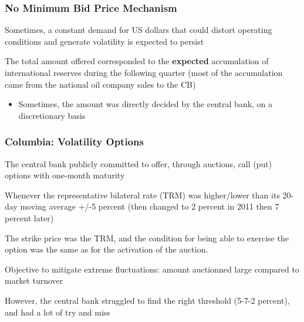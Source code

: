 \documentclass{beamer}
\newenvironment{largeitemize}{\itemize\addtolength{\itemsep}{10pt}}{\enditemize}
\begin{document}
\begin{frame}
  \frametitle{No Minimum Bid Price Mechanism}
  \begin{largeitemize}
  \item Sometimes, a constant demand for US dollars that could distort operating conditions
    and generate volatility is expected to persist
  \item The total amount offered corresponded to the \textbf{expected} accumulation of international
reserves during the following quarter (most of the accumulation came from the
national oil company sales to the CB)
\begin{itemize}
\item Sometimes, the amount was directly decided by the central bank, on a
  discretionary basis
\end{itemize}
  \end{largeitemize}  
\end{frame}


\begin{frame}
  \frametitle{Columbia: Volatility Options}
  \begin{largeitemize}
  \item The central bank publicly committed to offer, through auctions, call (put)
    options with one-month maturity 
  \item Whenever the representative bilateral rate (TRM) was higher/lower than its 20-day moving average +/-5 percent (then changed to 2 percent in 2011 then 7 percent later)
    \item  The strike price was the TRM, and the condition for being able to exercise
      the option was the same as for the activation of the auction.
    \item Objective to mitigate extreme fluctuations: amount
      auctionned large compared to market turnover
    \item However, the central bank struggled to find the right threshold
      (5-7-2 percent), and had a lot of try and miss
  \end{largeitemize}
  \end{frame}
\end{document}
